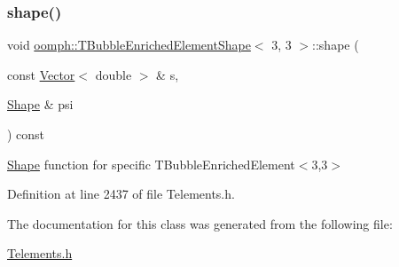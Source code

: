 \subsubsection{\texorpdfstring{shape()}{shape()}}
{\footnotesize\ttfamily void \hyperlink{classoomph_1_1TBubbleEnrichedElementShape}{oomph\+::\+T\+Bubble\+Enriched\+Element\+Shape}$<$ 3, 3 $>$\+::shape (\begin{DoxyParamCaption}\item[{const \hyperlink{classoomph_1_1Vector}{Vector}$<$ double $>$ \&}]{s,  }\item[{\hyperlink{classoomph_1_1Shape}{Shape} \&}]{psi }\end{DoxyParamCaption}) const\hspace{0.3cm}{\ttfamily [inline]}}



\hyperlink{classoomph_1_1Shape}{Shape} function for specific T\+Bubble\+Enriched\+Element$<$3,3$>$ 



Definition at line 2437 of file Telements.\+h.



The documentation for this class was generated from the following file\+:\begin{DoxyCompactItemize}
\item 
\hyperlink{Telements_8h}{Telements.\+h}\end{DoxyCompactItemize}
